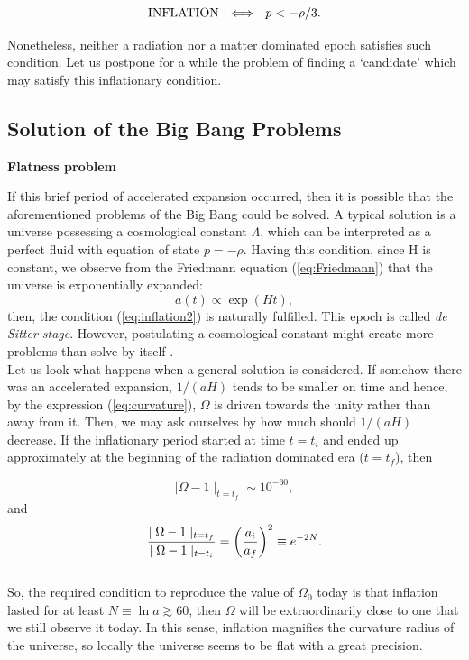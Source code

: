 \documentclass{rmaa}
\def\beq{\begin{equation}}
\def\eeq{\end{equation}}
\begin{document}
\beq 
{\rm INFLATION} ~~ \Longleftrightarrow~~p<-\rho/3.
\eeq

\noindent
Nonetheless, neither a radiation nor a matter dominated epoch satisfies such condition. 
Let us postpone for a while the problem of finding a `candidate' which may satisfy this inflationary condition.



\subsection{Solution of the Big Bang Problems}

\noindent
\textbf {Flatness problem}
\vskip 6pt

If this brief period of accelerated expansion occurred, then it is possible that the 
aforementioned problems of the Big Bang could be solved. 
A typical solution is a universe possessing a cosmological constant $\Lambda$, which can be 
interpreted as a perfect fluid with equation of state $p=-\rho$. Having this condition, 
since H is constant, we observe from the Friedmann equation (\ref{eq:Friedmann}) that 
the universe is exponentially expanded:
%
\beq
a(t)\propto \exp(Ht),
\eeq
then, the condition  
(\ref{eq:inflation2}) is naturally fulfilled. This epoch is called \textit{de Sitter stage}.
However, postulating a cosmological constant might create more problems than
solve by itself \citep{Carrol01}.
\\

Let us look what happens when a general solution is considered.
If somehow there was an accelerated expansion, $1/(aH)$ tends to be smaller on time and hence,
by the expression (\ref{eq:curvature}), $\Omega$ is driven towards the unity rather than away from it. 
Then, we may ask ourselves by how much should $1/(aH)$ decrease. 
If the inflationary period started at time $t=t_i$ 
and ended up approximately at the beginning of the radiation dominated era ($t=t_f$), then 

$$
\mid \Omega -1\mid_{t=t_f}\sim10^{-60},
$$
and
\beq
\frac{\mid \Omega -1\mid_{t=t_f}}{\mid \Omega -1\mid_{t=t_i}}= \left( a_i \over a_f \right)^2\equiv e^{-2N}.
\eeq
\\
%
So, the required condition to reproduce the value of $\Omega_0$ today is 
that inflation lasted for at least $N\equiv\ln a \gtrsim 60 $, then $\Omega$ will be
extraordinarily close to one that we still observe it today.
In this sense, inflation magnifies the curvature radius of the universe, so 
locally the universe seems to be flat with a great precision.
\end{document}
